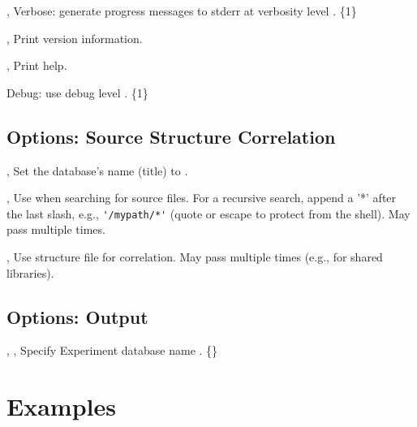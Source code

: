 \documentclass[english]{article}
\begin{document}
\begin{Description}
\item[\OptoArg{-v}{n}, \OptoArg{--verbose}{n}]
Verbose: generate progress messages to stderr at verbosity level .  \{1\} 
\item[\Opt{-V}, \Opt{--version}]
Print version information.

\item[\Opt{-h}, \Opt{--help}]
Print help.

\item[\OptoArg{--debug}{n}]
Debug: use debug level . \{1\}
\end{Description}

\subsection{Options: Source Structure Correlation}

\begin{Description}
\item[\OptArg{--name}{name}, \OptArg{--title}{name}]
Set the database's name (title) to .

\item[\OptArg{-I}{path}, \OptArg{--include}{path}] 
Use  when searching for source files. For a recursive search, append a '*' after the last slash, e.g., \verb+'/mypath/*'+ (quote or escape to protect from the shell). May pass multiple times.

\item[\OptArg{-S}{file}, \OptArg{--structure}{file}] 
Use  structure file  for correlation.  May pass multiple times (e.g., for shared libraries).
\end{Description}

\subsection{Options: Output}

\begin{Description}
  \item[\OptArg{-o}{db-path}, \OptArg{--db}{db-path}, \OptArg{--output}{db-path}] Specify Experiment database name .  \{\}
\end{Description}


\section{Examples}
\end{document}
